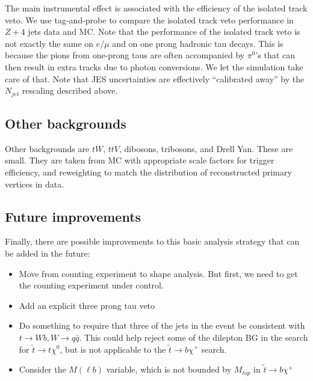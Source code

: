 The main instrumental effect is associated with the efficiency of the isolated track veto.
We use tag-and-probe to compare the isolated track veto performance in $Z + 4$ jets data and 
MC.  Note that the performance of the isolated track veto 
is not exactly the same on $e/\mu$ and on one prong hadronic tau decays.  This is because
the pions from one-prong taus are often accompanied by $\pi^0$'s that can then result in extra 
tracks due to photon conversions.  We let the simulation take care of that.  
Note that JES uncertainties are effectively ``calibrated away'' by the $N_{jet}$ rescaling described above.  



\subsection{Other backgrounds}
\label{sec:other-general}
Other backgrounds are $tW$, $ttV$, dibosons, tribosons, and Drell Yan.
These  are small.  They are taken from MC with appropriate scale
factors for trigger efficiency, and reweighting to match the distribution of reconstructed primary vertices in data.


\subsection{Future improvements}
\label{sec:improvements-general}
Finally, there are possible improvements to this basic analysis strategy that can be added in the future:
\begin{itemize}
\item Move from counting experiment to shape analysis.  But first, we need to get the counting
experiment under control.
\item Add an explicit three prong tau veto
\item Do something to require that three of the jets in the event be consistent with $t \to Wb, W \to q\bar{q}$.
This could help reject some of the dilepton BG in the search for $\widetilde{t} \to t \chi^0$, 
but is not applicable to the $\widetilde{t} \to b \chi^+$ search.
\item Consider the $M(\ell b)$ variable, which is not bounded by $M_{top}$ in $\widetilde{t} \to b \chi^+$
\end{itemize}
